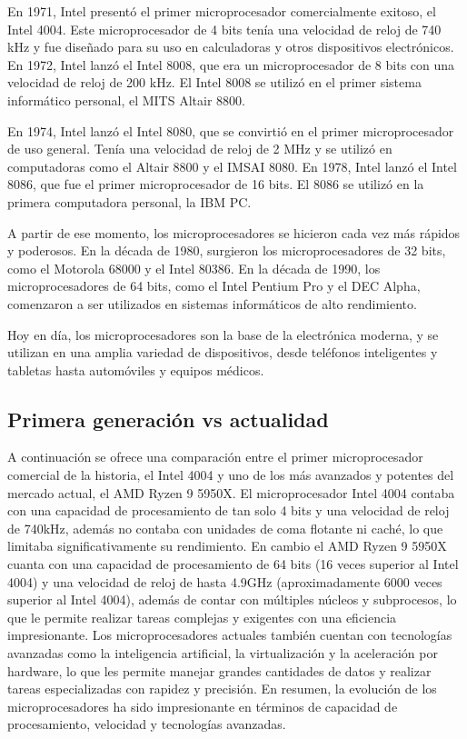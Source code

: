 \documentclass{article}
\begin{document}
En 1971, Intel presentó el primer microprocesador comercialmente exitoso, el Intel 4004. 
Este microprocesador de 4 bits tenía una velocidad de reloj de 740 kHz y fue diseñado para su uso en calculadoras 
y otros dispositivos electrónicos. En 1972, Intel lanzó el Intel 8008, que era un microprocesador de 8 bits 
con una velocidad de reloj de 200 kHz. El Intel 8008 se utilizó en el primer sistema informático personal, 
el MITS Altair 8800.

En 1974, Intel lanzó el Intel 8080, que se convirtió en el primer microprocesador de uso general. 
Tenía una velocidad de reloj de 2 MHz y se utilizó en computadoras como el Altair 8800 y el IMSAI 8080. 
En 1978, Intel lanzó el Intel 8086, que fue el primer microprocesador de 16 bits. El 8086 se utilizó en 
la primera computadora personal, la IBM PC.

A partir de ese momento, los microprocesadores se hicieron cada vez más rápidos y poderosos. En la década de 1980, 
surgieron los microprocesadores de 32 bits, como el Motorola 68000 y el Intel 80386. En la década de 1990, 
los microprocesadores de 64 bits, como el Intel Pentium Pro y el DEC Alpha, comenzaron a ser utilizados 
en sistemas informáticos de alto rendimiento.

Hoy en día, los microprocesadores son la base de la electrónica moderna, y se utilizan en una amplia 
variedad de dispositivos, desde teléfonos inteligentes y tabletas hasta automóviles y equipos médicos.

\subsection*{Primera generación vs actualidad}
A continuación se ofrece una comparación entre el primer microprocesador comercial de la historia, 
el Intel 4004 y uno de los más avanzados y potentes del mercado actual, el AMD Ryzen 9 5950X. 
El microprocesador Intel 4004 contaba con una capacidad de procesamiento de tan solo 4 bits y una 
velocidad de reloj de 740kHz, además no contaba con unidades de coma flotante ni caché, lo que limitaba 
significativamente su rendimiento. En cambio el AMD Ryzen 9 5950X cuanta con una capacidad de procesamiento
de 64 bits (16 veces superior al Intel 4004) y una velocidad de reloj de hasta 4.9GHz (aproximadamente 6000 veces superior 
al Intel 4004), además de contar con múltiples núcleos y subprocesos, lo que le permite realizar tareas complejas 
y exigentes con una eficiencia impresionante. Los microprocesadores actuales también cuentan con tecnologías avanzadas 
como la inteligencia artificial, la virtualización y la aceleración por hardware, lo que les permite manejar 
grandes cantidades de datos y realizar tareas especializadas con rapidez y precisión. En resumen, la evolución de 
los microprocesadores ha sido impresionante en términos de capacidad de procesamiento, velocidad y tecnologías avanzadas.
\end{document}

